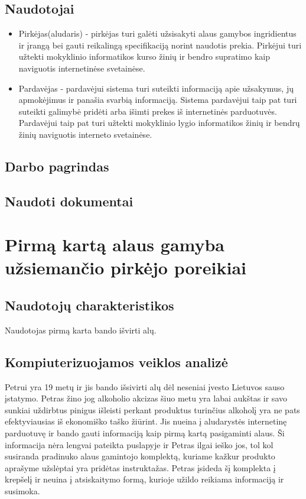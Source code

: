 \documentclass[oneside]{VUMIFPSkursinis}
\begin{document}
	\subsection{Naudotojai}
		\begin{itemize}
			\item{Pirkėjas(aludaris) - pirkėjas turi galėti užsisakyti alaus gamybos ingridientus ir įrangą bei gauti reikalingą specifikaciją norint naudotis prekia.
				Pirkėjui turi užtekti mokyklinio informatikos kurso žinių ir bendro supratimo kaip naviguotis internetinėse svetainėse.}
			\item{Pardavėjas - pardavėjui sistema turi suteikti informaciją apie užsakymus, jų apmokėjimus ir panašia svarbią informaciją.
				Sistema pardavėjui taip pat turi suteikti galimybė pridėti arba išimti prekes iš internetinės parduotuvės.
				Pardavėjui taip pat turi užtekti mokyklinio lygio informatikos žinių ir bendrų žinių naviguotis interneto svetainėse.}
		\end{itemize}
	\subsection{Darbo pagrindas}
	\subsection{Naudoti dokumentai}

\section{Pirmą kartą alaus gamyba užsiemančio pirkėjo poreikiai}
	\subsection{Naudotojų charakteristikos}
		Naudotojas pirmą karta bando išvirti alų.
	\subsection{Kompiuterizuojamos veiklos analizė}
		Petrui yra 19 metų ir jis bando išsivirti alų dėl neseniai įvesto Lietuvos sauso įstatymo.
		Petras žino jog alkoholio akcizas šiuo metu yra labai aukštas ir savo sunkiai uždirbtus pinigus išleisti perkant produktus turinčius alkoholį yra ne pats efektyviausias iš ekonomiško taško žiūrint.
		Jis nueina į aludarystės internetinę parduotuvę ir bando gauti informaciją kaip pirmą kartą pasigaminti alaus.
		Ši informacija nėra lengvai pateikta puslapyje ir Petras ilgai ieško jos, tol kol susiranda pradinuko alaus gamintojo komplektą, kuriame kažkur produkto aprašyme užslėptai yra pridėtas instruktažas.
		Petras įsideda šį komplekta į krepšelį ir neuina į atsiskaitymo formą, kurioje užildo reikiama informaciją ir susimoka.
\end{document}
